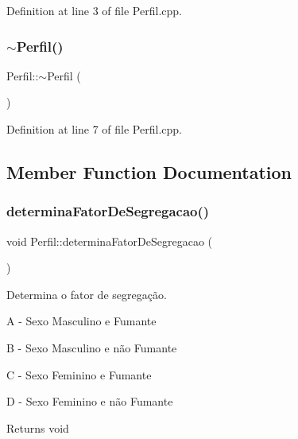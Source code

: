 Definition at line 3 of file Perfil.\+cpp.

\hypertarget{class_perfil_a23978d891d08e7e8b4547849429eacec}{}\label{class_perfil_a23978d891d08e7e8b4547849429eacec} 
\subsubsection{\texorpdfstring{$\sim$\+Perfil()}{~Perfil()}}
{\footnotesize\ttfamily Perfil\+::$\sim$\+Perfil (\begin{DoxyParamCaption}{ }\end{DoxyParamCaption})\hspace{0.3cm}{\ttfamily [virtual]}}



Definition at line 7 of file Perfil.\+cpp.



\subsection{Member Function Documentation}
\hypertarget{class_perfil_ae3e87c88b74f8f1ac18a9fb79906d7bf}{}\label{class_perfil_ae3e87c88b74f8f1ac18a9fb79906d7bf} 
\subsubsection{\texorpdfstring{determina\+Fator\+De\+Segregacao()}{determinaFatorDeSegregacao()}}
{\footnotesize\ttfamily void Perfil\+::determina\+Fator\+De\+Segregacao (\begin{DoxyParamCaption}{ }\end{DoxyParamCaption})}



Determina o fator de segregação. 


\begin{DoxyItemize}
\item A -\/ Sexo Masculino e Fumante
\item B -\/ Sexo Masculino e não Fumante
\item C -\/ Sexo Feminino e Fumante
\item D -\/ Sexo Feminino e não Fumante \begin{DoxyReturn}{Returns}
void 
\end{DoxyReturn}

\end{DoxyItemize}


